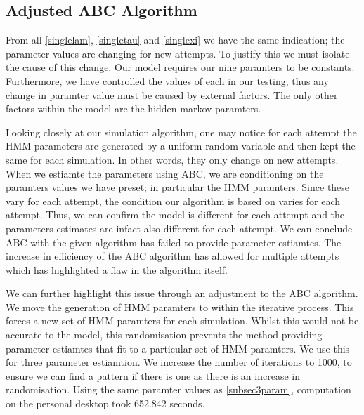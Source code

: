 \subsection{Adjusted ABC Algorithm}

From all \ref{singlelam}, \ref{singletau} and \ref{singlexi} we have the same indication; the parameter values are changing for new attempts. To justify this we must isolate the cause of this change. Our model requires our nine paramters to be constants. Furthermore, we have controlled the values of each in our testing, thus any change in paramter value must be caused by external factors. The only other factors within the model are the hidden markov paramters. 

Looking closely at our simulation algorithm, one may notice for each attempt the HMM parameters are generated by a uniform random variable and then kept the same for each simulation. In other words, they only change on new attempts. When we estiamte the parameters using ABC, we are conditioning on the paramters values we have preset; in particular the HMM paramters. Since these vary for each attempt, the condition our algorithm is based on varies for each attempt. Thus, we can confirm the model is different for each attempt and the parameters estimates are infact also different for each attempt. 
We can conclude ABC with the given algorithm has failed to provide parameter estiamtes. The increase in efficiency of the ABC algorithm has allowed for multiple attempts which has highlighted a flaw in the  algorithm itself. 

We can further highlight this issue through an adjustment to the ABC algorithm. We move the generation of HMM paramters to within the iterative process. This forces a new set of HMM paramters for each simulation. Whilst this would not be accurate to the model, this randomisation prevents the method providing parameter estiamtes that fit to a particular set of HMM paramters. We use this for three parameter estiamtion. We increase the number of iterations to 1000, to ensure we can find a pattern if there is one as there is an increase in randomisation. Using the same paramter values as \ref{subsec3param}, computation on the personal desktop took 652.842 seconds.

